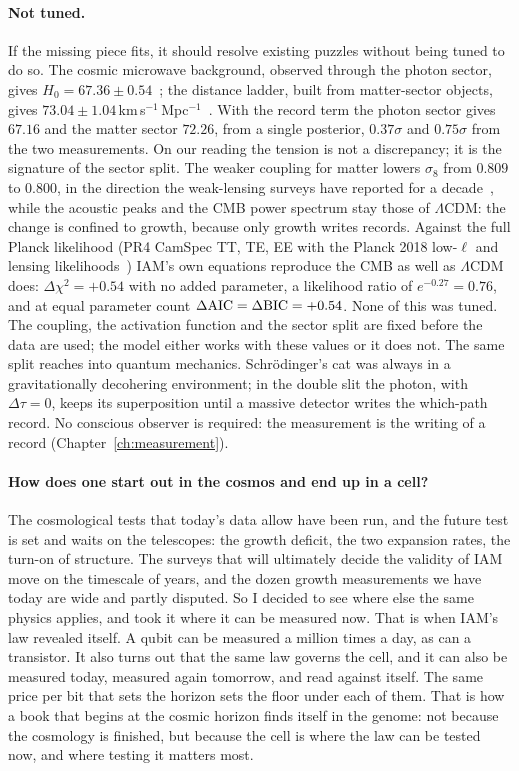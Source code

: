 \paragraph{Not tuned.} If the missing piece fits, it should resolve existing puzzles without being tuned to do so. The cosmic microwave
background, observed through the photon sector, gives $H_0=67.36\pm0.54$~\cite{Planck2018VI}; the distance ladder, built from matter-sector
objects, gives $73.04\pm1.04$\,km\,s$^{-1}$\,Mpc$^{-1}$~\cite{Riess2022}. \observed{} With the record term the photon sector gives $67.16$ and the
matter sector $72.26$, from a single posterior, $0.37\sigma$ and $0.75\sigma$ from the two measurements. \calc{} On our reading the tension is not a
discrepancy; it is the signature of the sector split. \interp{} The weaker coupling for matter lowers $\sigma_8$ from $0.809$ to $0.800$, in the
direction the weak-lensing surveys have reported for a decade~\cite{Heymans2021,AbbottDESY3_2022}, \measured{} while the acoustic peaks and the
CMB power spectrum stay those of $\Lambda$CDM: the change is confined to growth, because only growth writes records. Against the full Planck
likelihood (PR4 CamSpec TT, TE, EE with the Planck 2018 low-$\ell$ and lensing likelihoods~\cite{Rosenberg2022,Planck2018V,Planck2018VIII}) IAM's own equations reproduce the CMB as well as $\Lambda$CDM does: $\Delta\chi^2=+0.54$ with no added parameter, a likelihood ratio of $e^{-0.27}=0.76$, and at equal parameter count $\Delta{\rm AIC}=\Delta{\rm BIC}=+0.54$.
\calc{} None of this was tuned. The coupling, the activation function and the sector split are fixed before the data are used; the model either
works with these values or it does not. The same split reaches into quantum mechanics. Schr\"odinger's cat was always in a gravitationally
decohering environment; in the double slit the photon, with $\Delta\tau=0$, keeps its superposition until a massive detector writes the
which-path record. No conscious observer is required: the measurement is the writing of a record (Chapter~\ref{ch:measurement}). \interp


\paragraph{How does one start out in the cosmos and end up in a cell?} The cosmological tests that today's data allow have been run, and the
future test is set and waits on the telescopes: the growth deficit, the two expansion rates, the turn-on of structure. The surveys that will
ultimately decide the validity of IAM move on the timescale of years, and the dozen growth measurements we have today are wide and partly
disputed. So I decided to see where else the same physics applies, and took it where it can be measured now. That is when IAM's law revealed
itself. A qubit can be measured a million times a day, as can a transistor. It also turns out that the same law governs the cell, and it can
also be measured today, measured again tomorrow, and read against itself. The same price per bit that sets the horizon sets the floor under
each of them. That is how a book that begins at the cosmic horizon finds itself in the genome: not because the cosmology is finished, but
because the cell is where the law can be tested now, and where testing it matters most.

